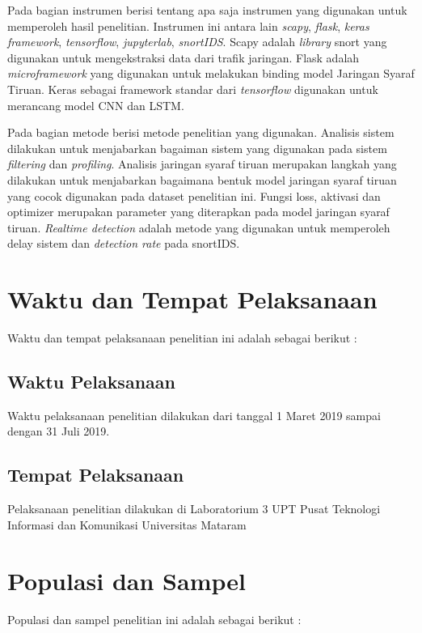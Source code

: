 \documentclass[./skripsi.tex]{subfiles}
\begin{document}
\par Pada bagian instrumen berisi tentang apa saja instrumen yang digunakan untuk memperoleh hasil penelitian. Instrumen ini antara lain \textit{scapy}, \textit{flask}, \textit{keras framework}, \textit{tensorflow}, \textit{jupyterlab}, \textit{snortIDS}. Scapy adalah \textit{library} snort yang digunakan untuk mengekstraksi data dari trafik jaringan. Flask adalah \textit{microframework} yang digunakan untuk melakukan binding model Jaringan Syaraf Tiruan. Keras sebagai framework standar dari \textit{tensorflow} digunakan untuk merancang model CNN dan LSTM.
\par Pada bagian metode berisi metode penelitian yang digunakan. Analisis sistem dilakukan untuk menjabarkan bagaiman sistem yang digunakan pada sistem \textit{filtering} dan \textit{profiling}. Analisis jaringan syaraf tiruan merupakan langkah yang dilakukan untuk menjabarkan bagaimana bentuk model jaringan syaraf tiruan yang cocok digunakan pada dataset penelitian ini. Fungsi loss, aktivasi dan optimizer merupakan parameter yang diterapkan pada model jaringan syaraf tiruan. \textit{Realtime detection} adalah metode yang digunakan untuk memperoleh delay sistem dan \textit{detection rate} pada snortIDS.
\section{Waktu dan Tempat Pelaksanaan}
\par Waktu dan tempat pelaksanaan penelitian ini adalah sebagai berikut :
\subsection{Waktu Pelaksanaan}

\par Waktu pelaksanaan penelitian dilakukan dari tanggal 1 Maret 2019 sampai dengan 31 Juli 2019.
\subsection{Tempat Pelaksanaan}
\par Pelaksanaan penelitian dilakukan di Laboratorium 3 UPT Pusat Teknologi Informasi dan Komunikasi Universitas Mataram
\section{Populasi dan Sampel}
\par Populasi dan sampel penelitian ini adalah sebagai berikut :
\end{document}
